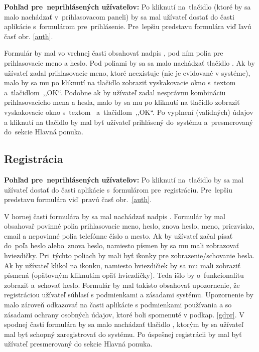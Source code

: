 \textbf{Pohľad pre~neprihlásených užívateľov:} Po kliknutí na~tlačidlo  (ktoré by sa malo nachádzať v~prihlasovacom paneli) by sa mal užívateľ dostať do časti aplikácie s~formulárom pre~prihlásenie. Pre~lepšiu predstavu formulára viď ľavú časť obr. \ref{auth}.

Formulár by mal vo vrchnej časti obsahovať nadpis , pod ním polia pre prihlasovacie meno a heslo. Pod poliami by sa sa malo nachádzať tlačidlo . Ak by užívateľ zadal prihlasovacie meno, ktoré neexistuje (nie je evidované v systéme), malo by sa mu po kliknutí na tlačidlo  zobraziť vyskakovacie okno s~textom~ a~tlačidlom~,,OK``. Podobne ak by užívateľ zadal nesprávnu kombináciu prihlasovacieho mena a hesla, malo by sa mu po kliknutí na tlačidlo  zobraziť vyskakovacie okno s~textom~ a~tlačidlom~,,OK``. Po vyplnení (validných) údajov a kliknutí na tlačidlo  by mal byť užívateľ prihlásený do~systému a~presmerovaný do~sekcie Hlavná ponuka.

\subsection{Registrácia}
\label{registracia}

\textbf{Pohľad pre~neprihlásených užívateľov:} Po kliknutí na~tlačidlo  by sa mal užívateľ dostať do časti aplikácie s~formulárom pre~registráciu. Pre~lepšiu predstavu formulára viď~pravú časť obr.~\ref{auth}.

V hornej časti formulára by sa mal nachádzať nadpis . Formulár by mal obsahovař povinné polia prihlasovacie meno, heslo, znova heslo, meno, priezvisko, email a nepovinné polia telefónne číslo a mesto. Ak by užívateľ začal písať do~poľa heslo alebo~znova heslo, namiesto písmen by sa mu mali zobrazovať hviezdičky. Pri~týchto poliach by mali byť ikonky pre zobrazenie/schovanie hesla. Ak by užívateľ klikol na ikonku, namiesto hviezdičiek by sa mu mali zobraziť písmená (opätovným kliknutím opäť hviezdičky). Teda išlo by o~funkcionalitu zobraziť a~schovať heslo. Formulár by mal takisto obsahovať upozornenie, že registráciou užívateľ súhlasí s podmienkami a zásadami systému. Upozornenie by malo zároveň odkazovať na časti aplikácie s podmienkami používania a so zásadami ochrany osobných údajov, ktoré boli spomenuté v podkap. \ref{gdpr}. V spodnej časti formulára by sa malo nachádzať tlačidlo , ktorým by sa užívateľ mal byť schopný zaregistrovať do systému. Po úspešnej registrácii by mal byť užívateľ presmerovaný do sekcie Hlavná ponuka.

